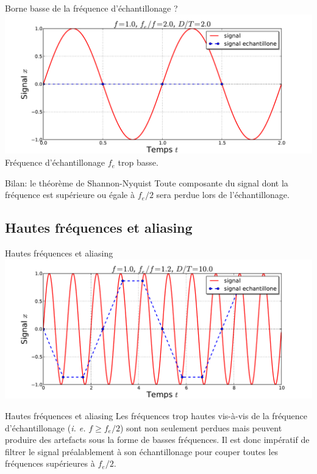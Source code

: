 \documentclass[8pt,a4paper]{beamer}
\begin{document}
  \begin{frame}{Borne basse de la fréquence d'échantillonage ?}
  \includegraphics[width=1.\textwidth]{figures/echant_sin_2.pdf}\\
  \alert{Fréquence d'échantillonage $f_e$ trop basse.}
  \begin{alertblock}{Bilan: le théorème de Shannon-Nyquist}
  Toute composante du signal dont la fréquence est supérieure ou égale à $f_e/2$ sera perdue lors de l'échantillonage.
  \end{alertblock}
  \end{frame}
  \subsection{Hautes fréquences et aliasing}
  \begin{frame}{Hautes fréquences et aliasing}
  \includegraphics[width=1.\textwidth]{figures/echant_sin_6.pdf}\\
  \begin{alertblock}{Hautes fréquences et aliasing}
  Les fréquences trop hautes vis-à-vis de la fréquence d'échantillonage (\textit{i. e.} $f\geq f_e/2$) sont non seulement perdues mais peuvent produire des artefacts sous la forme de basses fréquences. Il est donc impératif de filtrer le signal préalablement à son échantillonage pour couper toutes les fréquences supérieures à $f_e/2$.
  \end{alertblock}
  \end{frame}
\end{document}
